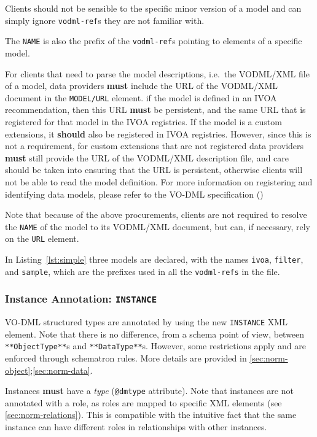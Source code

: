\documentclass[11pt,a4paper]{ivoa}
\begin{document}
Clients should not be sensible to the specific minor version of a model
and can simply ignore \texttt{vodml-ref}s they are not familiar with.

The \texttt{NAME} is also the prefix of the \texttt{vodml-ref}s pointing
to elements of a specific model.

For clients that need to parse the model descriptions, i.e.~the
VODML/XML file of a model, data providers \textbf{must} include the URL
of the VODML/XML document in the \texttt{MODEL/URL} element. if the
model is defined in an IVOA recommendation, then this URL \textbf{must}
be persistent, and the same URL that is registered for that model in the
IVOA registries. If the model is a custom extensions, it \textbf{should}
also be registered in IVOA registries. However, since this is not a
requirement, for custom extensions that are not registered data
providers \textbf{must} still provide the URL of the VODML/XML
description file, and care should be taken into ensuring that the URL is
persistent, otherwise clients will not be able to read the model
definition. For more information on registering and identifying data
models, please refer to the VO-DML specification (\cite{2018ivoa.spec.0910L})

Note that because of the above procurements, clients are not required to
resolve the \texttt{NAME} of the model to its VODML/XML document, but
can, if necessary, rely on the \texttt{URL} element.

In Listing~\ref{lst:simple} three models are declared, with the names
\texttt{ivoa}, \texttt{filter}, and \texttt{sample}, which are the
prefixes used in all the \texttt{vodml-refs} in the file.

\subsubsection{Instance Annotation: \texttt{INSTANCE}}\label{sec:norm-instance}

VO-DML structured types are annotated by using the new \texttt{INSTANCE}
XML element. Note that there is no difference, from a schema point of
view, between \texttt{**ObjectType**}s and \texttt{**DataType**}s.
However, some restrictions apply and are enforced through schematron
rules. More details are provided in
\ref{sec:norm-object};\ref{sec:norm-data}.

Instances \textbf{must} have a \emph{type} (\texttt{@dmtype} attribute). Note
that instances are not annotated with a role, as roles are mapped to
specific XML elements (see \ref{sec:norm-relations}). This is
compatible with the intuitive fact that the same instance can have
different roles in relationships with other instances.
\end{document}

